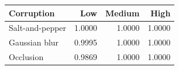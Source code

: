 \begin{tabular}{lrrr}
\toprule
Corruption & Low & Medium & High \\
\midrule
Salt-and-pepper & 1.0000 & 1.0000 & 1.0000 \\
Gaussian blur & 0.9995 & 1.0000 & 1.0000 \\
Occlusion & 0.9869 & 1.0000 & 1.0000 \\
\bottomrule
\end{tabular}
